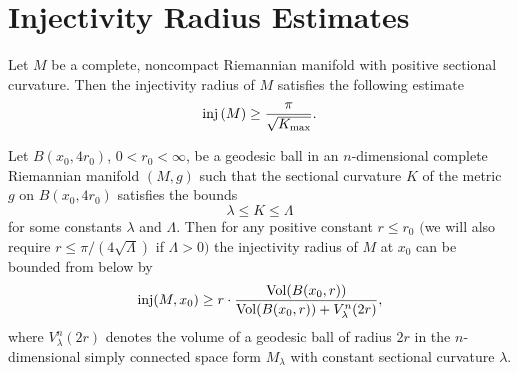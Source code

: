 \section{Injectivity Radius Estimates}
\begin{theorem}
  \label{thm:cz-gromollmeyer-injectivity-radius-estimate}
 Let $M$
be a complete, noncompact Riemannian manifold with positive
sectional curvature. Then the injectivity radius of $M$ satisfies
the following estimate
$$
{\rm inj}\,(M)\geq\frac{\pi}{\sqrt{K_{\max}}}.
$$
\end{theorem}
\begin{theorem}
  \label{thm:cz-local-injectivity-radius-estimate-from-volume-and-curvature}
Let $B(x_0, 4r_0)$, $0<r_0<\infty$, be a geodesic ball in an
$n$-dimensional complete Riemannian manifold $(M,g)$ such that the
sectional curvature $K$ of the metric $g$ on $B(x_0,4r_0)$
satisfies the bounds
$$
\lambda\leq K\leq\Lambda
$$
for some constants $\lambda$ and $\Lambda$. Then for any positive
constant $r\le r_0$ $($we will also require $r\le
\pi/(4\sqrt{\Lambda})$ if $\Lambda>0)$ the injectivity radius of
$M$ at $x_0$ can be bounded from below by
$$
\mbox{\rm inj}(M, x_0)\geq r\cdot\frac{\operatorname{Vol}(B(x_0,
r))}{\operatorname{Vol}(B(x_0,r))+V^n_{\lambda}(2r)},
$$
where $V_{\lambda}^n(2r)$ denotes the volume of a geodesic ball of
radius $2r$ in the $n$-dimensional simply connected space form
$M_{\lambda}$ with constant sectional curvature $\lambda$.
\end{theorem}
